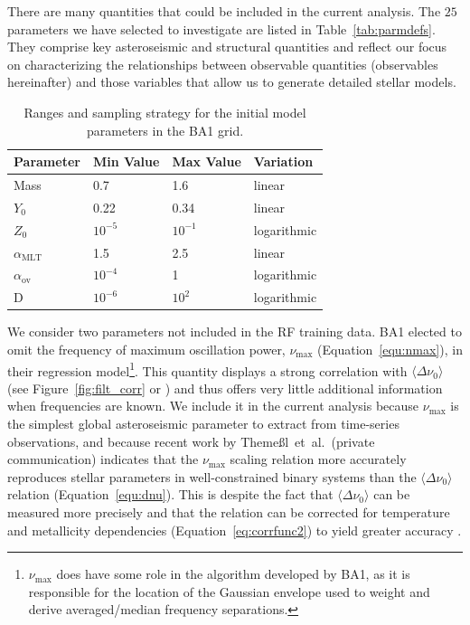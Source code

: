 There are many quantities that could be included in the current analysis. 
The $25$ parameters we have selected to investigate are listed in Table~\ref{tab:parmdefs}. 
They  comprise key asteroseismic and structural quantities and reflect our focus on characterizing the relationships between observable quantities (observables hereinafter) and those variables that allow us to generate detailed stellar models. 


\begin{table}
\centering
\begin{tabular}{llll}
\hline \hline
Parameter	&	Min Value	&	Max Value	&	Variation 	\\ 
\hline 
Mass	&	0.7	&	1.6	&	linear\\
$Y_0$	&	0.22	&	0.34	&	linear\\
$Z_0$	&	$10^{-5}$	&	$10^{-1}$	&	logarithmic\\
$\alpha_{\text{MLT}}$	&	1.5	&	2.5	&	linear\\
$\alpha_{\text{ov}}$	&	$10^{-4}$	&	1	&	logarithmic\\
D	&	$10^{-6}$	&	$10^{2}$	&	logarithmic	\\
\hline
\end{tabular}
\caption{Ranges and sampling strategy for the initial model parameters in the BA1 grid.}
\label{tab:prange}
\end{table}

We consider two parameters not included in the RF training data. 
BA1 elected to omit the frequency of maximum oscillation power, $\nu_{\max}$ (Equation~\ref{equ:nmax}), in their regression model\footnote{$\nu_{\max}$ does have some role in the algorithm developed by BA1, as it is responsible for the location of the Gaussian envelope used to weight and derive averaged/median frequency separations.}. This quantity displays a strong correlation with ${\langle\Delta\nu_0\rangle}$  (see Figure~\ref{fig:filt_corr}  or \citealt{2009A&A...506..465H,2009MNRAS.400L..80S}) and thus offers very little additional information when frequencies are known. 
We include it in the current analysis because $\nu_{\max}$ is the simplest global asteroseismic parameter to extract from time-series observations, and because recent work by Theme{\ss}l~et~al.~(private communication) indicates that the $\nu_{\max}$ scaling relation more accurately reproduces stellar parameters in well-constrained binary systems than the ${\langle\Delta\nu_0\rangle}$ relation (Equation~\ref{equ:dnu}). This is despite the fact that ${\langle\Delta\nu_0\rangle}$ can be measured more precisely and that the relation can be corrected for temperature and metallicity dependencies (Equation~\ref{eq:corrfunc2}) to yield greater accuracy \citep{2016MNRAS.460.4277G, 2016ApJ...822...15S}. 

